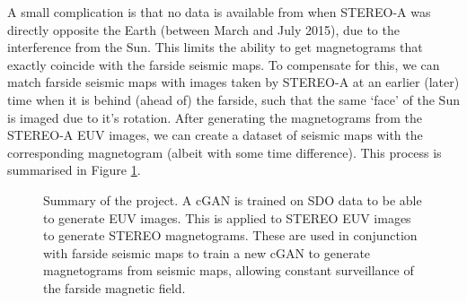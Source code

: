 \documentclass[11pt,a4paper,onecolumn]{report}
\begin{document}
A small complication is that no data is available from when STEREO-A was
directly opposite the Earth (between March and July 2015), due to the
interference from the Sun. This limits the ability to get magnetograms that
exactly coincide with the farside seismic maps. To compensate for this, we can
match farside seismic maps with images taken by STEREO-A at an earlier (later)
time when it is behind (ahead of) the farside, such that the same `face' of the
Sun is imaged due to it's rotation. After generating the magnetograms from the
STEREO-A EUV images, we can create a dataset of seismic maps with the
corresponding magnetogram (albeit with some time difference). This process is
summarised in Figure \ref{fig:Project_summary}.\\



\begin{figure}
  \centering
  \caption[Project Pipeline]{Summary of the project. A cGAN is trained on SDO
    data to be able to generate EUV images. This is applied to STEREO EUV images
    to generate STEREO magnetograms. These are used in conjunction with farside
    seismic maps to train a new cGAN to generate magnetograms from seismic maps,
    allowing constant surveillance of the farside magnetic field.}
  \label{fig:Project_summary}
\end{figure}
\end{document}
